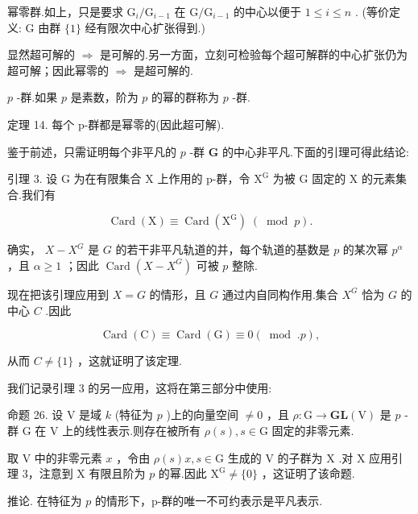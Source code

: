\documentclass[10pt]{article}
\begin{document}
幂零群.如上，只是要求 \({\mathrm{G}}_{i}/{\mathrm{G}}_{i - 1}\) 在 \(\mathrm{G}/{\mathrm{G}}_{i - 1}\) 的中心以便于 \(1 \leq  i \leq  n\) . (等价定义: \(\mathrm{G}\) 由群 \(\{ 1\}\) 经有限次中心扩张得到.)

显然超可解的 \(\Rightarrow\) 是可解的.另一方面，立刻可检验每个超可解群的中心扩张仍为超可解；因此幂零的 \(\Rightarrow\) 是超可解的.

\(p\) -群.如果 \(p\) 是素数，阶为 \(p\) 的幂的群称为 \(p\) -群.

定理 14. 每个 p-群都是幂零的(因此超可解).

鉴于前述，只需证明每个非平凡的 \(p\) -群 \(\mathbf{G}\) 的中心非平凡.下面的引理可得此结论:

引理 3. 设 \(\mathrm{G}\) 为在有限集合 \(\mathrm{X}\) 上作用的 p-群，令 \({\mathrm{X}}^{\mathrm{G}}\) 为被 \(\mathrm{G}\) 固定的 \(\mathrm{X}\) 的元素集合.我们有

\[
\operatorname{Card}\left( \mathrm{X}\right)  \equiv  \operatorname{Card}\left( {\mathrm{X}}^{\mathrm{G}}\right) \;\left( {\;\operatorname{mod}\;p}\right) .
\]

确实， \(X - {X}^{G}\) 是 \(G\) 的若干非平凡轨道的并，每个轨道的基数是 \(p\) 的某次幂 \({p}^{\alpha }\) ，且 \(\alpha  \geq  1\) ；因此 \(\operatorname{Card}\left( {X - {X}^{G}}\right)\) 可被 \(p\) 整除.

现在把该引理应用到 \(X = G\) 的情形，且 \(G\) 通过内自同构作用.集合 \({X}^{G}\) 恰为 \(G\) 的中心 \(C\) .因此

\[
\operatorname{Card}\left( \mathrm{C}\right)  \equiv  \operatorname{Card}\left( \mathrm{G}\right)  \equiv  0\left( {\;\operatorname{mod}\;.p}\right) ,
\]

从而 \(C \neq  \{ 1\}\) ，这就证明了该定理.

我们记录引理 3 的另一应用，这将在第三部分中使用:

命题 26. 设 \(\mathrm{V}\) 是域 \(k\) (特征为 \(p\) )上的向量空间 \(\neq  0\) ，且 \(\rho  : \mathrm{G} \rightarrow  \mathbf{{GL}}\left( \mathrm{V}\right)\) 是 \(p\) -群 \(\mathrm{G}\) 在 \(\mathrm{V}\) 上的线性表示.则存在被所有 \(\rho \left( s\right) ,s \in  \mathrm{G}\) 固定的非零元素.

取 \(\mathrm{V}\) 中的非零元素 \(x\) ，令由 \(\rho \left( s\right) x,s \in  \mathrm{G}\) 生成的 \(\mathrm{V}\) 的子群为 \(\mathrm{X}\) .对 \(\mathrm{X}\) 应用引理 3，注意到 \(\mathrm{X}\) 有限且阶为 \(p\) 的幂.因此 \({\mathrm{X}}^{\mathrm{G}} \neq  \{ 0\}\) ，这证明了该命题.

推论. 在特征为 \(p\) 的情形下，p-群的唯一不可约表示是平凡表示.
\end{document}
